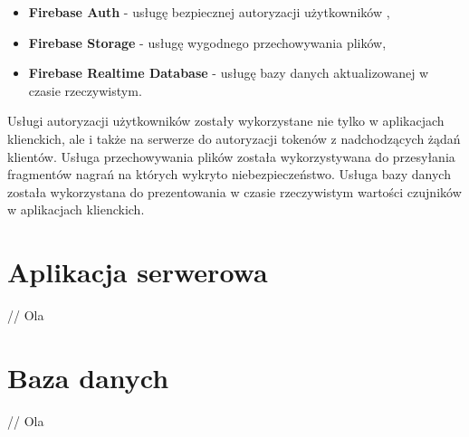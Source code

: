 \begin{itemize}
    \item \textbf{Firebase Auth} - usługę bezpiecznej autoryzacji użytkowników ,
    \item \textbf{Firebase Storage} - usługę wygodnego przechowywania plików,
    \item \textbf{Firebase Realtime Database} - usługę bazy danych aktualizowanej w czasie rzeczywistym.
\end{itemize}

Usługi autoryzacji użytkowników zostały wykorzystane nie tylko w aplikacjach klienckich, ale i także na serwerze do autoryzacji tokenów z nadchodzących żądań klientów. Usługa przechowywania plików została wykorzystywana do przesyłania fragmentów nagrań na których wykryto niebezpieczeństwo. Usługa bazy danych została wykorzystana do prezentowania w czasie rzeczywistym wartości czujników w aplikacjach klienckich.

\section{Aplikacja serwerowa}

// Ola

\section{Baza danych}

// Ola

